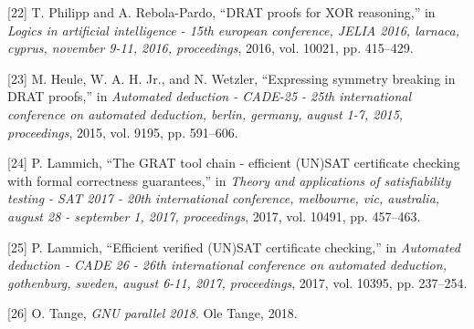 \documentclass[
]{report}
\begin{document}
\leavevmode\hypertarget{ref-DBLP:confux2fjeliaux2fPhilippR16}{}%
{[}22{]} T. Philipp and A. Rebola-Pardo, ``DRAT proofs for XOR
reasoning,'' in \emph{Logics in artificial intelligence - 15th european
conference, JELIA 2016, larnaca, cyprus, november 9-11, 2016,
proceedings}, 2016, vol. 10021, pp. 415--429.

\leavevmode\hypertarget{ref-DBLP:confux2fcadeux2fHeuleHW15}{}%
{[}23{]} M. Heule, W. A. H. Jr., and N. Wetzler, ``Expressing symmetry
breaking in DRAT proofs,'' in \emph{Automated deduction - CADE-25 - 25th
international conference on automated deduction, berlin, germany, august
1-7, 2015, proceedings}, 2015, vol. 9195, pp. 591--606.

\leavevmode\hypertarget{ref-DBLP:confux2fsatux2fLammich17}{}%
{[}24{]} P. Lammich, ``The GRAT tool chain - efficient (UN)SAT
certificate checking with formal correctness guarantees,'' in
\emph{Theory and applications of satisfiability testing - SAT 2017 -
20th international conference, melbourne, vic, australia, august 28 -
september 1, 2017, proceedings}, 2017, vol. 10491, pp. 457--463.

\leavevmode\hypertarget{ref-DBLP:confux2fcadeux2fLammich17}{}%
{[}25{]} P. Lammich, ``Efficient verified (UN)SAT certificate
checking,'' in \emph{Automated deduction - CADE 26 - 26th international
conference on automated deduction, gothenburg, sweden, august 6-11,
2017, proceedings}, 2017, vol. 10395, pp. 237--254.

\leavevmode\hypertarget{ref-Tange2018}{}%
{[}26{]} O. Tange, \emph{GNU parallel 2018}. Ole Tange, 2018.
\end{document}
